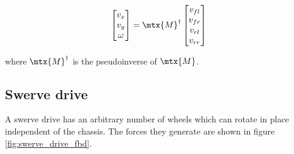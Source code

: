 \begin{equation}
  \begin{bmatrix}
    v_x \\
    v_y \\
    \omega
  \end{bmatrix} =
  \mtx{M}^\dagger
  \begin{bmatrix}
    v_{fl} \\
    v_{fr} \\
    v_{rl} \\
    v_{rr}
  \end{bmatrix}
\end{equation}

where $\mtx{M}^\dagger$ is the pseudoinverse of $\mtx{M}$.

\subsection{Swerve drive}

A swerve drive has an arbitrary number of wheels which can rotate in place
independent of the chassis. The forces they generate are shown in figure
\ref{fig:swerve_drive_fbd}.

